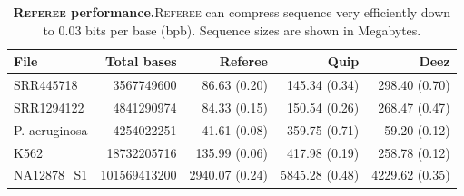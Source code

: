\documentclass[12pt]{cmuthesis}
\newcommand{\refer}{\textsc{Referee}\xspace}
\begin{document}
  \begin{table}[ht!]
    \caption{\textbf{\refer performance.}\refer can compress sequence very efficiently down to 0.03 bits per base (bpb). Sequence sizes are shown in Megabytes.}
    \label{tab:seq-compression}
    \centering
    \begin{tabular}{l r r r r}
    \toprule
    File & Total bases &  Referee & Quip & Deez \\
    \midrule
    SRR445718 & 3567749600 & 86.63 (0.20) & 145.34 (0.34) & 298.40 (0.70) \\
    SRR1294122 & 4841290974 & 84.33 (0.15) & 150.54 (0.26) & 268.47 (0.47) \\
    P. aeruginosa & 4254022251 & 41.61 (0.08) & 359.75 (0.71) & 59.20 (0.12) \\
    K562 & 18732205716 & 135.99 (0.06) & 417.98 (0.19) & 258.78 (0.12) \\
    NA12878\_S1 & 101569413200 & 2940.07 (0.24) & 5845.28 (0.48) & 4229.62 (0.35) \\
    \bottomrule
    \end{tabular}
  \end{table}
\end{document}
